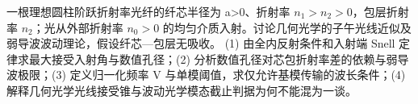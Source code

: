 一根理想圆柱阶跃折射率光纤的纤芯半径为 a>0、折射率 \(n_{1}>n_{2}>0\)，包层折射率 \(n_{2}\)；光从外部折射率 \(n_{0}>0\) 的均匀介质入射。讨论几何光学的子午光线近似及弱导波波动理论，假设纤芯—包层无吸收。
(1) 由全内反射条件和入射端 Snell 定律求最大接受入射角与数值孔径；(2) 分析数值孔径对芯包折射率差的依赖与弱导波极限；(3) 定义归一化频率 V 与单模阈值，求仅允许基模传输的波长条件；(4) 解释几何光学光线接受锥与波动光学模态截止判据为何不能混为一谈。
